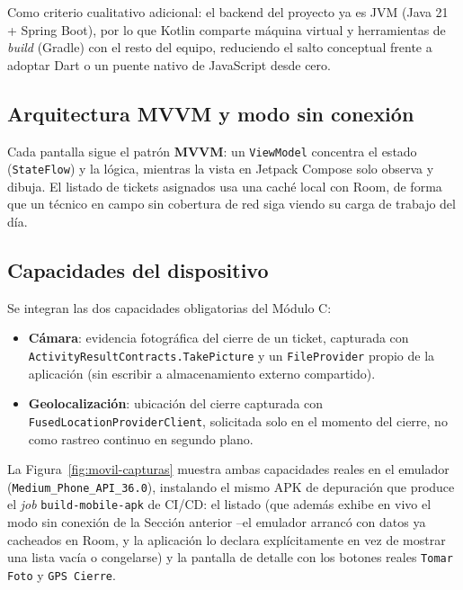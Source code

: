 Como criterio cualitativo adicional: el backend del proyecto ya es JVM (Java 21 + Spring Boot),
por lo que Kotlin comparte máquina virtual y herramientas de \emph{build} (Gradle) con el resto
del equipo, reduciendo el salto conceptual frente a adoptar Dart o un puente nativo de JavaScript
desde cero.

\subsection{Arquitectura MVVM y modo sin conexión}

Cada pantalla sigue el patrón \textbf{MVVM}: un \texttt{ViewModel} concentra el estado
(\texttt{StateFlow}) y la lógica, mientras la vista en Jetpack Compose solo observa y dibuja. El
listado de tickets asignados usa una caché local con Room, de forma que un técnico en campo sin
cobertura de red siga viendo su carga de trabajo del día.

\subsection{Capacidades del dispositivo}

Se integran las dos capacidades obligatorias del Módulo C:

\begin{itemize}[nosep]
  \item \textbf{Cámara}: evidencia fotográfica del cierre de un ticket, capturada con
        \texttt{ActivityResultContracts.TakePicture} y un \texttt{FileProvider} propio de la
        aplicación (sin escribir a almacenamiento externo compartido).
  \item \textbf{Geolocalización}: ubicación del cierre capturada con
        \texttt{FusedLocationProviderClient}, solicitada solo en el momento del cierre, no como
        rastreo continuo en segundo plano.
\end{itemize}

La Figura~\ref{fig:movil-capturas} muestra ambas capacidades reales en el emulador
(\texttt{Medium\_Phone\_API\_36.0}), instalando el mismo APK de depuración que produce el
\emph{job} \texttt{build-mobile-apk} de CI/CD: el listado (que además exhibe en vivo el modo sin
conexión de la Sección anterior --el emulador arrancó con datos ya cacheados en Room, y la
aplicación lo declara explícitamente en vez de mostrar una lista vacía o congelarse) y la pantalla
de detalle con los botones reales \texttt{Tomar Foto} y \texttt{GPS Cierre}.

